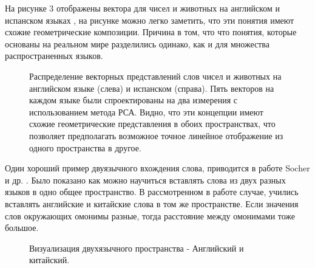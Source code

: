 \documentclass[12pt]{article}
\begin{document}
На рисунке 3 отображены вектора для чисел и животных на английском и испанском языках \cite{Le}, на рисунке можно легко заметить, что эти понятия имеют схожие геометрические композиции. Причина в том, что что понятия, которые основаны на реальном мире разделились одинако, как и для множества распространенных языков.
	\begin{figure}[H]
		\noindent{}
		\caption{Распределение векторных представлений слов чисел и животных на английском языке (слева) и испанском (справа). Пять векторов на каждом языке
были спроектированы на два измерения с использованием метода РСА. Видно, что эти концепции имеют схожие геометрические представления в обоих пространствах,
 что позволяет предполагать возможное точное линейное отображение из одного пространства в другое.}
		\label{figCurves}
	\end{figure}

Один хороший пример двуязычного вхождения слова, приводится в работе Socher и др. \cite{Zou}. Было показано как можно научиться вставлять слова из двух разных языков в одно общее пространство. В рассмотренном в работе случае, учились вставлять английские и китайские слова в том же пространстве. Если значения слов окружающих омонимы разные, тогда расстояние между омонимами тоже большое.

 	\begin{figure}[H]
		\noindent{}
		\caption{Визуализация двухязычного пространства - Английский и китайский.}
		\label{figCurves}
	\end{figure}
\end{document}
